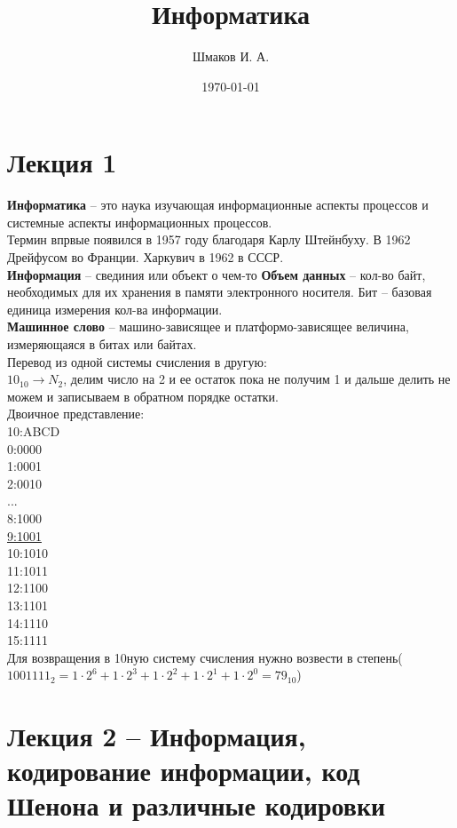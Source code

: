 \documentclass[a4paper, 12pt]{article}
\title{Информатика}
\author{Шмаков И. А.}
\date{\today}
\begin{document}
\sffamily
\maketitle
\section*{Лекция 1}
\textbf{Информатика} -- это наука изучающая информационные аспекты процессов и системные аспекты информационных процессов.\\
Термин впрвые появился в 1957 году благодаря Карлу Штейнбуху. В 1962 Дрейфусом во Франции. Харкувич в 1962 в СССР.\\
\textbf{Информация} -- свединия или объект о чем-то
\textbf{Объем данных} -- кол-во байт, необходимых для их хранения в памяти электронного носителя. Бит -- базовая единица измерения кол-ва информации.\\
\textbf{Машинное слово} -- машино-зависящее и платформо-зависящее величина, измеряющаяся в битах или байтах.
\\ Перевод из одной системы счисления в другую:\\
$ 10_{10} \to N_{2} $, делим число на 2 и ее остаток пока не получим 1 и дальше делить не можем и записываем в обратном порядке остатки.\\
Двоичное представление:\\
10:ABCD\\
0:0000\\
1:0001\\
2:0010\\
  ...\\
8:1000\\
\underline{9:1001}\\
10:1010\\
11:1011\\
12:1100\\
13:1101\\
14:1110\\
15:1111\\

Для возвращения в 10ную систему счисления нужно возвести в степень($   1001111_2 = 1\cdot2^6 +1\cdot2^3+1\cdot2^2+1\cdot2^1+1\cdot2^0 = 79_{10}$)




\section*{Лекция 2 -- Информация, кодирование информации, код Шенона и различные кодировки}
\end{document}
